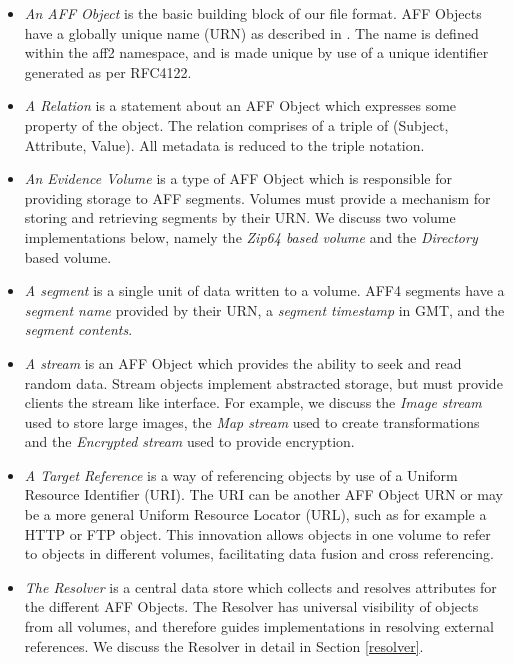 \documentclass[10pt, conference]{IEEEtran}
\begin{document}
\begin{itemize}
\item \emph{An AFF Object} is the basic building block of our
file format. AFF Objects have a globally unique name (URN) as described in
\cite{RFC1737}. The name is defined within the aff2 namespace, and is
made unique by use of a unique identifier generated as per
RFC4122\cite{RFC4122}.

\item \emph{A Relation} is a statement about an AFF Object which
expresses some property of the object. The relation comprises of a
triple of (Subject, Attribute, Value). All metadata is reduced to the
triple notation.

\item \emph{An Evidence Volume} is a type of AFF Object which is
responsible for providing storage to AFF segments. Volumes must
provide a mechanism for storing and retrieving segments by their
URN. We discuss two volume implementations below, namely the {\em
Zip64 based volume} and the {\em Directory} based volume.

\item \emph{A segment} is a single unit of data written to a volume. AFF4
  segments have a \emph{segment name} provided by their URN, a
  \emph{segment timestamp} in GMT, and the \emph{segment contents}.

\item \emph{A stream} is an AFF Object which provides the ability to
seek and read random data. Stream objects implement abstracted
storage, but must provide clients the stream like interface. For
example, we discuss the {\em Image stream} used to store large images,
the {\em Map stream} used to create transformations and the {\em
Encrypted stream} used to provide encryption.

\item \emph{A Target Reference} is a way of referencing objects by use
of a Uniform Resource Identifier (URI). The URI can be another AFF
Object URN or may be a more general Uniform Resource Locator (URL),
such as for example a HTTP or FTP object. This innovation allows
objects in one volume to refer to objects in different volumes,
facilitating data fusion and cross referencing.

\item \emph{The Resolver} is a central data store which collects and resolves
attributes for the different AFF Objects. The Resolver has universal
visibility of objects from all volumes, and therefore guides
implementations in resolving external references. We discuss the
Resolver in detail in Section \ref{resolver}.
\end{itemize}
\end{document}
